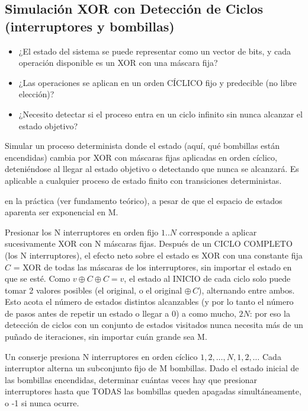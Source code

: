 \subsection{Simulación XOR con Detección de Ciclos (interruptores y bombillas)}


\begin{itemize}
\item ¿El estado del sistema se puede representar como un vector de bits, y cada operación disponible es un XOR con una máscara fija?
\item ¿Las operaciones se aplican en un orden CÍCLICO fijo y predecible (no libre elección)?
\item ¿Necesito detectar si el proceso entra en un ciclo infinito sin nunca alcanzar el estado objetivo?
\end{itemize}

 Simular un proceso determinista donde el estado (aquí, qué bombillas están encendidas) cambia por XOR con máscaras fijas aplicadas en orden cíclico, deteniéndose al llegar al estado objetivo o detectando que nunca se alcanzará. Es aplicable a cualquier proceso de estado finito con transiciones deterministas.

  en la práctica (ver fundamento teórico), a pesar de que el espacio de estados aparenta ser exponencial en M.

 Presionar los N interruptores en orden fijo $1..N$ corresponde a aplicar sucesivamente XOR con N máscaras fijas. Después de un CICLO COMPLETO (los N interruptores), el efecto neto sobre el estado es XOR con una constante fija $C$ = XOR de todas las máscaras de los interruptores, sin importar el estado en que se esté. Como $v \oplus C \oplus C = v$, el estado al INICIO de cada ciclo solo puede tomar 2 valores posibles (el original, o el original $\oplus\, C$), alternando entre ambos. Esto acota el número de estados distintos alcanzables (y por lo tanto el número de pasos antes de repetir un estado o llegar a 0) a como mucho, $2N$: por eso la detección de ciclos con un conjunto de estados visitados nunca necesita más de un puñado de iteraciones, sin importar cuán grande sea M.


Un conserje presiona N interruptores en orden cíclico $1,2,\ldots,N,1,2,\ldots$ Cada interruptor alterna un subconjunto fijo de M bombillas. Dado el estado inicial de las bombillas encendidas, determinar cuántas veces hay que presionar interruptores hasta que TODAS las bombillas queden apagadas simultáneamente, o -1 si nunca ocurre.

